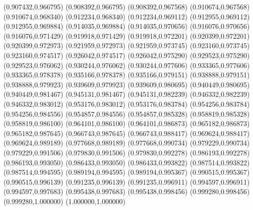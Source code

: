 (0.907432,0.966795)
(0.908392,0.966795)
(0.908392,0.967568)
(0.910674,0.967568)
(0.910674,0.968340)
(0.912234,0.968340)
(0.912234,0.969112)
(0.912955,0.969112)
(0.912955,0.969884)
(0.914035,0.969884)
(0.914035,0.970656)
(0.916076,0.970656)
(0.916076,0.971429)
(0.919918,0.971429)
(0.919918,0.972201)
(0.920399,0.972201)
(0.920399,0.972973)
(0.921959,0.972973)
(0.921959,0.973745)
(0.923160,0.973745)
(0.923160,0.974517)
(0.926042,0.974517)
(0.926042,0.975290)
(0.929523,0.975290)
(0.929523,0.976062)
(0.930244,0.976062)
(0.930244,0.977606)
(0.933365,0.977606)
(0.933365,0.978378)
(0.935166,0.978378)
(0.935166,0.979151)
(0.938888,0.979151)
(0.938888,0.979923)
(0.939609,0.979923)
(0.939609,0.980695)
(0.940449,0.980695)
(0.940449,0.981467)
(0.945131,0.981467)
(0.945131,0.982239)
(0.946332,0.982239)
(0.946332,0.983012)
(0.953176,0.983012)
(0.953176,0.983784)
(0.954256,0.983784)
(0.954256,0.984556)
(0.954857,0.984556)
(0.954857,0.985328)
(0.958819,0.985328)
(0.958819,0.986100)
(0.964101,0.986100)
(0.964101,0.986873)
(0.965182,0.986873)
(0.965182,0.987645)
(0.966743,0.987645)
(0.966743,0.988417)
(0.969624,0.988417)
(0.969624,0.989189)
(0.977668,0.989189)
(0.977668,0.990734)
(0.979229,0.990734)
(0.979229,0.991506)
(0.979830,0.991506)
(0.979830,0.992278)
(0.986193,0.992278)
(0.986193,0.993050)
(0.986433,0.993050)
(0.986433,0.993822)
(0.987514,0.993822)
(0.987514,0.994595)
(0.989194,0.994595)
(0.989194,0.995367)
(0.990515,0.995367)
(0.990515,0.996139)
(0.991235,0.996139)
(0.991235,0.996911)
(0.994597,0.996911)
(0.994597,0.997683)
(0.995438,0.997683)
(0.995438,0.998456)
(0.999280,0.998456)
(0.999280,1.000000)
(1.000000,1.000000)
